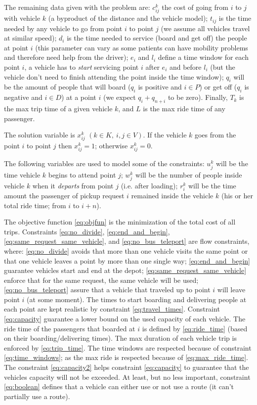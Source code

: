 \documentclass[english,plano-doutorado,twoside]{iiufrgs}
\begin{document}
The remaining data given with the problem are: \(c^k_{ij}\) the cost of going from \(i\) to \(j\) with vehicle \(k\) (a byproduct of the distance and the vehicle model); \(t_{ij}\) is the time needed by any vehicle to go from point \(i\) to point \(j\) (we assume all vehicles travel at similar speed); \(d_i\) is the time needed to service (board and get off) the people at point \(i\) (this parameter can vary as some patients can have mobility problems and therefore need help from the driver); \(e_i\) and \(l_i\) define a time window for each point \(i\), a vehicle has to \emph{start} servicing point \(i\) after \(e_i\) and before \(l_i\) (but the vehicle don't need to finish attending the point inside the time window); \(q_i\) will be the amount of people that will board (\(q_i\) is positive and \(i \in P\)) or get off (\(q_i\) is negative and \(i \in D\)) at a point \(i\) (we expect \(q_i + q_{n+i}\) to be zero). Finally, \(T_k\) is the max trip time of a given vehicle \(k\), and \(L\) is the max ride time of any passenger.

The solution variable is \(x^k_{ij}\) \((k \in K,~i,j \in V)\). If the vehicle \(k\) goes from the point \(i\) to point \(j\) then \(x^k_{ij} = 1\); otherwise \(x^k_{ij} = 0\).

The following variables are used to model some of the constraints: \(u^k_j\) will be the time vehicle \(k\) begins to attend point \(j\); \(w^k_j\) will be the number of people inside vehicle \(k\) when it \emph{departs} from point \(j\) (i.e. after loading); \(r^k_i\) will be the time amount the passenger of pickup request \(i\) remained inside the vehicle \(k\) (his or her total ride time; from \(i\) to \(i + n\)).

The objective function \eqref{eq:objfun} is the minimization of the total cost of all trips. Constraints \eqref{eq:no_divide}, \eqref{eq:end_and_begin}, \eqref{eq:same_request_same_vehicle}, and \eqref{eq:no_bus_teleport} are flow constraints, where: \eqref{eq:no_divide} avoids that more than one vehicle visits the same point or that one vehicle leaves a point by more than one single way; \eqref{eq:end_and_begin} guarantee vehicles start and end at the depot; \eqref{eq:same_request_same_vehicle} enforce that for the same request, the same vehicle will be used; \eqref{eq:no_bus_teleport} assure that a vehicle that traveled up to point \(i\) will leave point \(i\) (at some moment). The times to start boarding and delivering people at each point are kept realistic by constraint \eqref{eq:travel_times}. Constraint \eqref{eq:capacity} guarantee a lower bound on the used capacity of each vehicle. The ride time of the passengers that boarded at \(i\) is defined by \eqref{eq:ride_time} (based on their boarding/delivering times). The max duration of each vehicle trip is enforced by \eqref{eq:trip_time}. The time windows are respected because of constraint \eqref{eq:time_windows}; as the max ride is respected because of \eqref{eq:max_ride_time}. The constraint \eqref{eq:capacity2} helps constraint \eqref{eq:capacity} to guarantee that the vehicles capacity will not be exceeded. At least, but no less important, constraint \eqref{eq:boolean} defines that a vehicle can either use or not use a route (it can't partially use a route).
\end{document}
